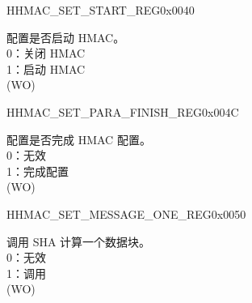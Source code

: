 \begin{register}{H}{HMAC\_SET\_START\_REG}{0x0040}\label{regdesc:HMACSETSTARTREG}
%
%
\regnewline%
\begin{regdesc}\begin{reglist}
\label{fielddesc:HMACSETSTART}\item [HMAC\_SET\_START] 配置是否启动 HMAC。
\\0：关闭 HMAC
\\1：启动 HMAC
\\(WO)
\end{reglist}\end{regdesc}
\end{register}


\begin{register}{H}{HMAC\_SET\_PARA\_FINISH\_REG}{0x004C}\label{regdesc:HMACSETPARAFINISHREG}
%
%
\regnewline%
\begin{regdesc}\begin{reglist}
\label{fielddesc:HMACSETPARAEND}\item [HMAC\_SET\_PARA\_END] 配置是否完成 HMAC 配置。
\\0：无效
\\1：完成配置
\\(WO)
\end{reglist}\end{regdesc}
\end{register}


\begin{register}{H}{HMAC\_SET\_MESSAGE\_ONE\_REG}{0x0050}\label{regdesc:HMACSETMESSAGEONEREG}
%
%
\regnewline%
\begin{regdesc}\begin{reglist}
\label{fielddesc:HMACSETTEXTONE}\item [HMAC\_SET\_TEXT\_ONE] 调用 SHA 计算一个数据块。
\\0：无效
\\1：调用
\\(WO)
\end{reglist}\end{regdesc}
\end{register}


